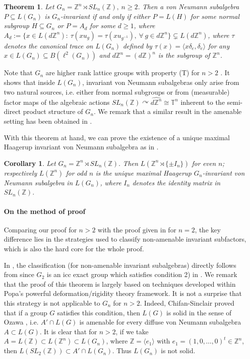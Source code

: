 \documentclass[12pt]{amsart}
\newtheorem{cor}[theorem]{Corollary}
\newtheorem{thm}[theorem]{Theorem}
\theoremstyle{definition}
\theoremstyle{remark}
\begin{document}
\begin{thm}\label{thm}
Let $G_{n}=\mathbb{Z}^n\rtimes SL_n(\mathbb{Z}),\ n\ge 2$. Then a von Neumann subalgebra $P\subseteq L(G_{n})$ is $G_n$-invariant if and only if either $P=L(H)$ for some normal subgroup $H\subseteq G_n$ or $P=A_d$ for some $d \ge 1$, where $A_d:=\{x\in L(d\mathbb{Z}^n):~\tau(xu_g)=\tau(xu_{g^{-1}}), ~\forall~g\in d\mathbb{Z}^n\}\subsetneq L(d\mathbb{Z}^n)$, where $\tau$ denotes the canonical trace on $L(G_n)$ defined by $\tau(x)=\langle x\delta_e, \delta_e\rangle$ for any $x\in L(G_n)\subseteq B(\ell^2(G_n))$ and $d\mathbb{Z}^n=(d\mathbb{Z})^n$ is the subgroup of $\mathbb{Z}^n$. 
\end{thm}
Note that $G_n$ are higher rank lattice groups with property (T) for $n>2$ \cite[Example 1.7.4(i)]{bdv}.
It shows that inside $L(G_n)$, invariant von Neumann subalgebras only  arise from two natural sources, i.e. either from normal subgroups or from (measurable) factor maps  of the algebraic actions $SL_n(\mathbb{Z})\curvearrowright\widehat{d\mathbb{Z}^n}\cong \mathbb{T}^n$ inherent to the semi-direct product structure of $G_n$. We remark that a similar result in the amenable setting has been obtained in \cite{adjs}.

With this theorem at hand, we can prove the existence of a unique maximal Haagerup invariant von Neumann subalgebra as in \cite{jiangliu}.
\begin{cor}\label{cor}
Let $G_n=\mathbb{Z}^n\rtimes SL_n(\mathbb{Z})$. Then $L(\mathbb{Z}^n\rtimes \{\pm I_n\})$ for even $n$; respectively $L(\mathbb{Z}^n)$ for odd $n$ is the unique maximal Haagerup $G_n$-invariant von Neumann subalgebra in $L(G_n)$, where $I_n$ denotes the identity matrix in $SL_n(\mathbb{Z})$.
\end{cor}


\paragraph{\textbf{On the method of proof}}

Comparing our proof for $n>2$ with the proof given in \cite{jiangliu} for $n=2$, the key difference lies in the strategies used to classify non-amenable invariant subfactors, which is also the hard core for the whole proof.

In \cite{jiangliu}, the classification (for non-amenable invariant subalgebras) directly follows from   \cite[Theorem 5.1]{cds} since $G_2$ is an icc exact group which satisfies condition 2) in \cite[Theorem 5.1]{cds}. We remark that the proof of this theorem is largely based on techniques developed within Popa's powerful deformation/rigidity theory framework. It is not a surprise that this strategy is not applicable to $G_n$ for $n>2$.  Indeed, Chifan-Sinclair \cite[Theorem A]{cs} proved that if a group $G$ satisfies this condition, then $L(G)$ is solid in the sense of Ozawa \cite{ozawa_solid}, i.e. $A'\cap L(G)$ is amenable for every diffuse von Neumann subalgebra $A\subset L(G)$. It is clear that for $n>2$, if we take $A=L(\mathbb{Z})\subset L(\mathbb{Z}^n)\subset L(G_n)$, where $\mathbb{Z}=\langle e_1\rangle$ with $e_1=(1,0,\ldots, 0)^t\in \mathbb{Z}^n$, then $L(SL_2(\mathbb{Z}))\subset A'\cap L(G_n)$. Thus $L(G_n)$ is not solid.
\end{document}
